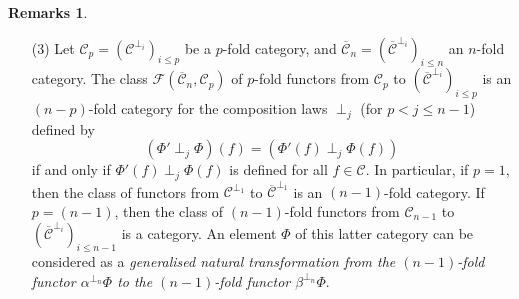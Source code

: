 \documentclass[a4paper,fleqn]{article}
\theoremstyle{plain}
\theoremstyle{definition}
\newtheorem*{remarks}{Remarks}
\newenvironment{longcomm}[1]
  {\noindent\textbf{[#1]}\rmfamily}
  {}
\renewcommand{\leq}{\leqslant}
\newcommand{\oldpage}[1]{{\marginpar{\footnotesize$\bigg\vert$\,\,\,\,\textit{p.~#1}}}}
\newcommand{\textand}{\quad\text{and}\quad}
\newcommand{\CC}{\mathcal{C}}
\newcommand{\FF}{\mathcal{F}}
\newcommand{\boxnum}[1]{{\fbox{\scriptsize${#1}$\vphantom{$jk$}}}}
\newcommand{\hsqbox}{{\boxminus}}
\DeclareMathOperator{\sq}{\square}
\DeclareMathOperator{\hsq}{\raisebox{-.05em}{$\hsqbox$}}
\newcommand{\hmult}{\mathbin{\raisebox{-.05em}{$\hsqbox$}}}
\begin{document}
\begin{remarks}
\begin{enumerate}
\begin{longcomm}{70.5}
        A simpler construction of the $n$-fold category $\CC^\boxnum{n}$ is done on p.~95.
        Cf. also the definition in \cite{coll120} of the functor
        \[
          \operatorname{Square}_{n,m}
          \colon \mathsf{Cat}_n
          \to \mathsf{Cat}_m
        \]
        for $n<m$, where the $n$-fold category $\operatorname{Square}_{n-1,n}\CC^\boxnum{n-1}$ is the same as $\CC^\boxnum{n}$, except for the fact that the first and last compositions are interchanged.
      \end{longcomm}

      The composition law $\perp_i$ on on $\CC^{[n]}$ is the inverse image under $\varepsilon_n^i$ of the longitudinal multiplication on $\varepsilon_n^i(\CC^{[n]})$.
      The composition law $\perp_n$ is defined by
      \[
        (\overline{h}',\overline{k}',\overline{k},\overline{h})
        \perp (h',k',k',h)
        = (\overline{h}'\hmult h', \overline{k}'\hmult k', \overline{k}\hmult k, \overline{h}\hmult h)
      \]
      if and only if $\overline{h}'\hmult h'$, $\overline{k}'\hmult k'$, $\overline{k}\hmult k$, and $\overline{h}\hmult h$ are all defined in $\hsq((\CC^{[n-1]})^{\perp_1},(\CC^{[n-1]})^{\perp_1})$.
      The $n$-fold category $(\CC^{[n]})_{i\leq n}^{\perp_i}$ admits as an $n$-fold subcategory the class $\CC^\boxnum{n}$, defined inductively by
      \[
        \CC^\boxnum{1} = \CC
        \textand
        \CC^\boxnum{n} = \sq\big((\CC^\boxnum{n-1}){^\perp_1}\big).
      \]
      \oldpage{399}
      In particular,
      \[
        \CC^\boxnum{2}
        = \sq\CC.
      \]

    \item[\normalfont(3)]
      Let $\CC_p=(\CC^{\perp_i})_{i\leq p}$ be a $p$-fold category, and $\overline{\CC}_n=(\overline{\CC}^{\perp_i})_{i\leq n}$ an $n$-fold category.
      The class $\FF(\overline{\CC}_n,\CC_p)$ of $p$-fold functors from $\CC_p$ to $(\overline{\CC}^{\perp_i})_{i\leq p}$ is an $(n-p)$-fold category for the composition laws $\perp_j$ (for $p<j\leq n-1$) defined by
      \[
        (\Phi'\perp_j\Phi)(f)
        = (\Phi'(f)\perp_j\Phi(f))
      \]
      if and only if $\Phi'(f)\perp_j\Phi(f)$ is defined for all $f\in\CC$.
      In particular, if $p=1$, then the class of functors from $\CC^{\perp_1}$ to $\overline{\CC}^{\perp_1}$ is an $(n-1)$-fold category.
      If $p=(n-1)$, then the class of $(n-1)$-fold functors from $\CC_{n-1}$ to $(\overline{\CC}^{\perp_i})_{i\leq n-1}$ is a category.
      An element $\Phi$ of this latter category can be considered as a \emph{generalised natural transformation from the $(n-1)$-fold functor $\alpha^{\perp_n}\Phi$ to the $(n-1)$-fold functor $\beta^{\perp_n}\Phi$}.


\end{enumerate}
\end{remarks}
\end{document}
